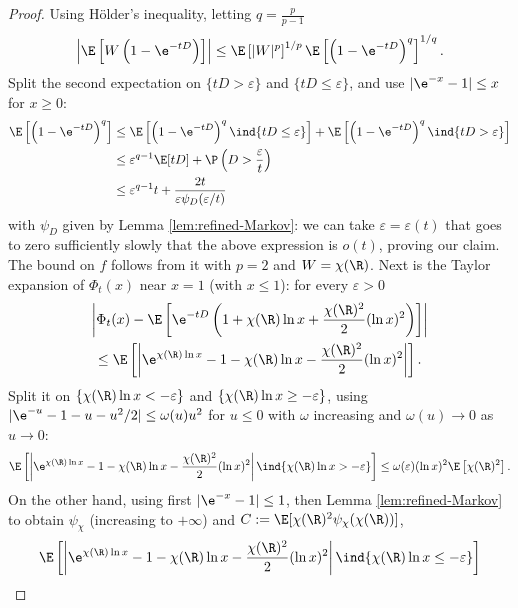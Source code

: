 \documentclass[10pt,a4paper]{article}
\begin{document}
\begin{proof}
Using Hölder's inequality, letting $q = \frac{p}{p-1}$
\[ \left| \E\left[W \left(1 - \e^{-tD}\right)\right]\right| \leq \E\left[|W|^p\right]^{1/p} \E\left[\left(1 - \e^{-tD}\right)^q\right]^{1/q} . \]
Split the second expectation on $\{ tD>\varepsilon\}$ and $\{tD\leq \varepsilon\}$, and use $|\e^{-x}-1|\leq x$ for $x\geq 0$:
\begin{align*}
\E\left[\left(1 - \e^{-tD}\right)^q\right] &\leq  \E\left[\left(1 - \e^{-tD}\right)^q \ind{tD \leq \varepsilon}\right] +  \E\left[\left(1 - \e^{-tD}\right)^q \ind{tD>\varepsilon} \right] \\
&\leq \varepsilon^{q-1} \E[tD] + \P\left( D > \frac{\varepsilon}{t}\right) \\
&\leq \varepsilon^{q-1} t + \frac{2t}{\varepsilon \psi_D(\varepsilon/t)} 
\end{align*}
with $\psi_D$ given by Lemma \ref{lem:refined-Markov}: we can take $\varepsilon = \varepsilon(t)$ that goes to zero sufficiently slowly that the above expression is $o(t)$, proving our claim. The bound on $f$ follows from it with $p=2$ and $W = \chi(\R)$. Next is the Taylor expansion of $\Phi_t(x)$ near $x=1$ (with $x\leq 1$): for every $\varepsilon>0$
\begin{multline*}
\left| \Phi_t(x) - \E\left[ \e^{-tD}\left( 1 + \chi(\R) \ln x + \frac{\chi(\R)^2}{2} (\ln x)^2 \right) \right] \right| \\
\leq \E\left[ \left| \e^{\chi(\R)\ln x} - 1 - \chi(\R) \ln x - \frac{\chi(\R)^2}{2} (\ln x)^2 \right| \right] .
\end{multline*}
Split it on $\{ \chi(\R)\ln x < -\varepsilon\}$ and $\{\chi(\R)\ln x \geq -\varepsilon\}$, using $|\e^{-u} - 1 - u - u^2/2| \leq \omega(u) u^2$ for $u\leq 0$ with $\omega$ increasing and $\omega(u) \to 0$ as $u\to 0$:
\begin{equation}\label{eq:lem-phit-taylor-exp-1}
\E\left[ \left| \e^{\chi(\R)\ln x} - 1 - \chi(\R) \ln x - \frac{\chi(\R)^2}{2} (\ln x)^2 \right| \ind{\chi(\R)\ln x > -\varepsilon} \right] \leq \omega(\varepsilon) (\ln x)^2 \E\left[ \chi(\R)^2 \right] .
\end{equation}
On the other hand, using first $|\e^{-x}-1| \leq 1$, then Lemma \ref{lem:refined-Markov} to obtain $\psi_\chi$ (increasing to $+\infty$) and $C := \E[\chi(\R)^2 \psi_\chi(\chi(\R))]$,
\begin{align}
& \E\left[ \left| \e^{\chi(\R)\ln x} - 1 - \chi(\R) \ln x - \frac{\chi(\R)^2}{2} (\ln x)^2 \right| \ind{\chi(\R)\ln x \leq -\varepsilon} \right]  \nonumber \\

\end{align}
\end{proof}
\end{document}
